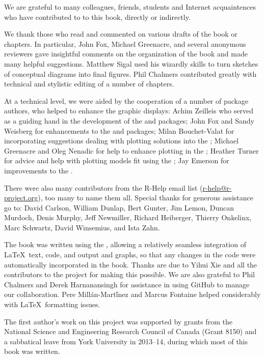 We are grateful to many colleagues, friends, students and Internet acquaintences who have contributed to
to this book, directly or indirectly.

We thank those who read and commented on various drafts of the book or chapters.
In particular, John Fox, Michael Greenacre, and several anonymous reviewers gave
insightful comments on the organization of the book and made many helpful suggestions.
Matthew Sigal used his wizardly skills to turn sketches of conceptual diagrams into
final figures. Phil Chalmers contributed greatly with technical and stylistic editing
of a number of chapters.

At a technical level, we were aided by the cooperation of a number of \R package authors, who
helped to enhance the graphic displays:
Achim Zeilleis who served as a guiding hand in the development of the  and  packages;
John Fox and Sandy Weisberg for enhancements to the  and  packages;
Milan Bouchet-Valat for incorporating suggestions dealing with plotting  solutions into the ;
Michael Greenacre and Oleg Nenadic for help to enhance plotting in the ;
Heather Turner for advice and help with plotting models fit using the ;
Jay Emerson for improvements to the .

There were also many contributors from the R-Help email list (\url{r-help@r-project.org}), too many to name them all.
Special thanks for generous assistance go to:
David Carlson,
William Dunlap,
Bert Gunter,
Jim Lemon,
Duncan Murdoch,
Denis Murphy,
Jeff Newmiller,
Richard Heiberger,
Thierry Onkelinx,
Marc Schwartz,
David Winsemius, and
Ista Zahn.

The book was written using the , allowing a relatively seamless 
integration of \LaTeX\  text, \R code, and \R output and graphs, so that any changes
in the code were automatically incorporated in the book.
Thanks are due to Yihui Xie and all the contributors to the  project
for making this possible.  We are also grateful to Phil Chalmers and Derek Harnanansingh
for assistance in using GitHub to manage our collaboration.
 Pere Mill\'an-Mart\'ínez and Marcus Fontaine helped considerably with \LaTeX\
formatting issues.

The first author's work on this project was supported by grants from the
National Science and Engineering Research Council of Canada (Grant 8150)
and a sabbatical leave from York University in 2013--14, during which most
of this book was written.


